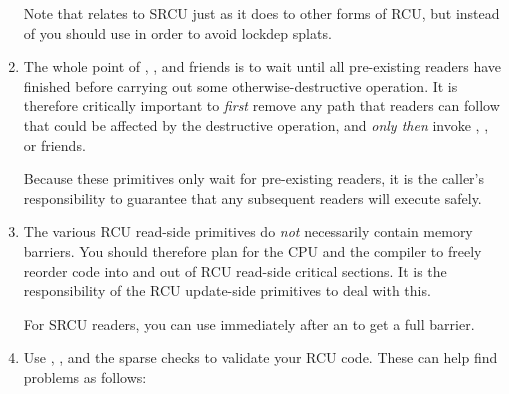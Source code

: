 \begin{enumerate}[start=0]
	Note that  relates to SRCU just as it does to
	other forms of RCU, but instead of  you should
	use  in order to avoid lockdep splats.

\item	The whole point of , , and friends
	is to wait until all pre-existing readers have finished before
	carrying out some otherwise-destructive operation.
	It is
	therefore critically important to \emph{first} remove any path
	that readers can follow that could be affected by the
	destructive operation, and \emph{only then} invoke ,
	, or friends.

	Because these primitives only wait for pre-existing readers, it
	is the caller's responsibility to guarantee that any subsequent
	readers will execute safely.

\item	The various RCU read-side primitives do \emph{not} necessarily contain
	memory barriers.
	You should therefore plan for the CPU
	and the compiler to freely reorder code into and out of RCU
	read-side critical sections.
	It is the responsibility of the
	RCU update-side primitives to deal with this.

	For SRCU readers, you can use 
	immediately after an  to get a full barrier.

\item	Use , , and the
	 sparse checks to validate your RCU code.
	These can help
	find problems as follows:

\end{enumerate}
